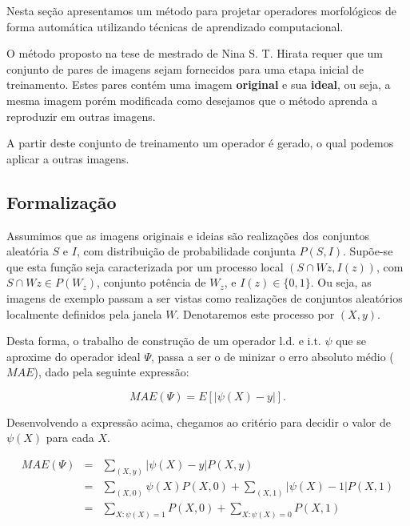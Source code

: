 \documentclass[a4paper,11pt]{article}
\begin{document}
Nesta seção apresentamos um método para projetar operadores morfológicos de forma automática utilizando técnicas de aprendizado computacional.

O método proposto na tese de mestrado de Nina S. T. Hirata \cite{Tomita:1996:PrAuMa} requer que um conjunto de pares de imagens sejam fornecidos para uma etapa inicial de treinamento. Estes pares contém uma imagem {\bf original} e sua {\bf ideal}, ou seja, a mesma imagem porém modificada como desejamos que o método aprenda a reproduzir em outras imagens.

A partir deste conjunto de treinamento um operador é gerado, o qual podemos aplicar a outras imagens.

\subsection{Formalização}

Assumimos que as imagens originais e ideias são realizações dos conjuntos aleatória $S$ e $I$, com distribuição de probabilidade conjunta $P(S,I)$. Supõe-se que esta função seja caracterizada por um processo local $(S \cap Wz, I(z))$, com $S \cap Wz \in P(W_z)$, conjunto potência de $W_z$, e $I(z) \in \{0, 1\}$. Ou seja, as imagens de exemplo passam a ser vistas como realizações de conjuntos aleatórios localmente definidos pela janela $W$. Denotaremos este processo por $(X, y)$.

Desta forma, o trabalho de construção de um operador l.d. e i.t. $\psi$ que se aproxime do operador ideal $\Psi$, passa a ser o de minizar o erro absoluto médio ($MAE$), dado pela seguinte expressão:

\begin{equation}
  MAE(\Psi) = E[|\psi(X) - y|].
\end{equation}

Desenvolvendo a expressão acima, chegamos ao critério para decidir o valor de $\psi(X)$ para cada $X$.

\begin{equation}
\begin{array}{rcl} 
  MAE(\Psi) & =  & \sum\limits_{(X, y)} |\psi(X) - y | P(X,y) \\
  & =  & \sum\limits_{(X, 0)} \psi(X)P(X, 0) + \sum\limits_{(X, 1)} |\psi(X) - 1|P(X, 1) \\
  & = & \sum\limits_{X \colon \psi(X) = 1} P(X, 0) + \sum\limits_{X \colon \psi(X) = 0} P(X, 1)
\end{array}
\end{equation}
\end{document}
